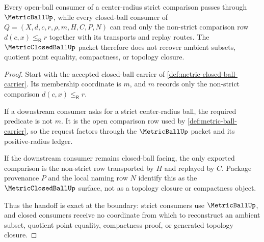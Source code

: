 \begin{theorem}
\label{thm:metric-closed-ball-metricball-boundary-handoff}
Every open-ball consumer of a center-radius strict comparison passes through $\MetricBallUp$, while every closed-ball consumer of $Q=(X,d,c,r,\rho,m,H,C,P,N)$ can read only the non-strict comparison row $d(c,x)\leq_{\mathsf R}r$ together with its transports and replay routes. The $\MetricClosedBallUp$ packet therefore does not recover ambient subsets, quotient point equality, compactness, or topology closure.
\end{theorem}
\begin{proof}
Start with the accepted closed-ball carrier of \autoref{def:metric-closed-ball-carrier}. Its membership coordinate is $m$, and $m$ records only the non-strict comparison $d(c,x)\leq_{\mathsf R}r$.

If a downstream consumer asks for a strict center-radius ball, the required predicate is not $m$. It is the open comparison row used by \autoref{def:metric-ball-carrier}, so the request factors through the $\MetricBallUp$ packet and its positive-radius ledger.

If the downstream consumer remains closed-ball facing, the only exported comparison is the non-strict row transported by $H$ and replayed by $C$. Package provenance $P$ and the local naming row $N$ identify this as the $\MetricClosedBallUp$ surface, not as a topology closure or compactness object.

Thus the handoff is exact at the boundary: strict consumers use $\MetricBallUp$, and closed consumers receive no coordinate from which to reconstruct an ambient subset, quotient point equality, compactness proof, or generated topology closure.
\end{proof}


